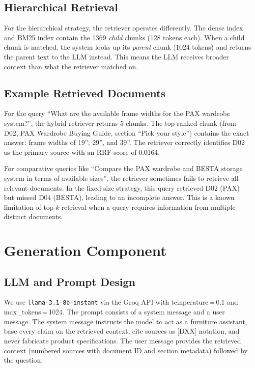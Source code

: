 \documentclass[conference]{IEEEtran}
\begin{document}
\subsection{Hierarchical Retrieval}

For the hierarchical strategy, the retriever operates differently. The dense index and BM25 index contain the 1369 \textit{child} chunks (128 tokens each). When a child chunk is matched, the system looks up its \textit{parent} chunk (1024 tokens) and returns the parent text to the LLM instead. This means the LLM receives broader context than what the retriever matched on.

\subsection{Example Retrieved Documents}

For the query ``What are the available frame widths for the PAX wardrobe system?'', the hybrid retriever returns 5 chunks. The top-ranked chunk (from D02, PAX Wardrobe Buying Guide, section ``Pick your style'') contains the exact answer: frame widths of 19\textonehalf{}'', 29\textonehalf{}'', and 39\textonequarter{}''. The retriever correctly identifies D02 as the primary source with an RRF score of 0.0164.

For comparative queries like ``Compare the PAX wardrobe and BESTA storage system in terms of available sizes'', the retriever sometimes fails to retrieve all relevant documents. In the fixed-size strategy, this query retrieved D02 (PAX) but missed D04 (BESTA), leading to an incomplete answer. This is a known limitation of top-$k$ retrieval when a query requires information from multiple distinct documents.

\section{Generation Component}

\subsection{LLM and Prompt Design}

We use \texttt{llama-3.1-8b-instant} via the Groq API with temperature\,=\,0.1 and max\_tokens\,=\,1024. The prompt consists of a system message and a user message. The system message instructs the model to act as a furniture assistant, base every claim on the retrieved context, cite sources as [DXX] notation, and never fabricate product specifications. The user message provides the retrieved context (numbered sources with document ID and section metadata) followed by the question.
\end{document}
